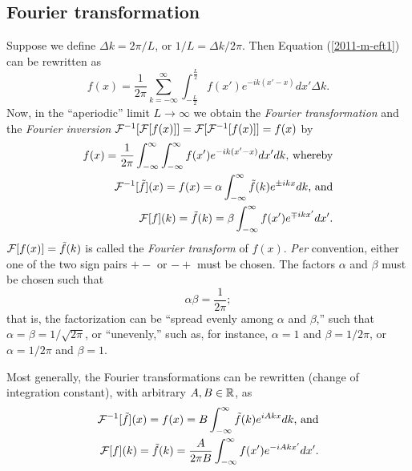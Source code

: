 \subsection{Fourier transformation}

Suppose we define
$\Delta {k} = 2\pi /L$, or $1/L = \Delta {k} /2\pi$.
Then Equation (\ref{2011-m-eft1}) can be rewritten  as
\begin{equation}
f(x)= \frac{1}{2\pi}
\sum _{k=-\infty}^\infty  \int_{-\frac{L}{2}}^\frac{L}{2} f(x') e^{-i{{k}(x'-x)}} dx' \Delta {k}
.
\end{equation}
Now,
in the ``aperiodic'' limit $L\rightarrow \infty$ we obtain  the {\em Fourier transformation}
and the {\em Fourier inversion}
$
{\cal F}^{-1}[{\cal F} [f(x)]]=
{\cal F} [{\cal F}^{-1}[f(x)]]= f(x)
$
by
\begin{equation}
\begin{split}
f(x)= \frac{1}{2\pi}
 \int_{-\infty}^\infty   \int_{-\infty}^\infty f(x') e^{-i{{k}(x'-x)}} dx' d{k} \textrm{, whereby} \\
  {\cal F}^{-1}[\tilde{f}](x)=f(x)=  \alpha \int_{-\infty}^\infty \tilde{f}(k) e^{\pm i{kx}} dk \textrm{, and} \\
 {\cal F}[f](k)=\tilde{f}(k)=  \beta \int_{-\infty}^\infty  f(x') e^{\mp i{kx'}} dx'
.
\end{split}
\label{2011-m-efta}
\end{equation}
$ {\cal F}[f(x)]= \tilde{f}(k)$
is called the {\em Fourier transform}
of $f(x)$.
{\em Per} convention, either one of the two sign pairs $+-$ or $-+$ must be chosen.
The factors $\alpha$ and $\beta$ must be chosen such that
\begin{equation}
 \alpha  \beta    = \frac{1}{2\pi};
\label{2011-m-efta1}
\end{equation}
that is, the factorization can be ``spread evenly among $\alpha$ and $\beta$,''
such that  $\alpha=\beta=1/\sqrt{2\pi}$, or ``unevenly,''
such as, for instance,
 $\alpha=1$ and $\beta=1/ 2\pi $,
or    $\alpha=1/ 2\pi $ and $\beta=1$.


Most generally, the Fourier transformations can be rewritten (change of integration constant),
 with arbitrary $A,B\in {\Bbb R}$,
as
\begin{equation}
\begin{split}
 {\cal F}^{-1}[\tilde{f}](x)=f(x)= B \int_{-\infty}^\infty \tilde{f}(k) e^{  iA{kx}} dk \textrm{, and} \\
 {\cal F}[f](k)=\tilde{f}(k)=  \frac{A}{2\pi B} \int_{-\infty}^\infty  f(x') e^{- iA{kx'}} dx'
.
\end{split}
\label{2011-m-efta1mg}
\end{equation}

